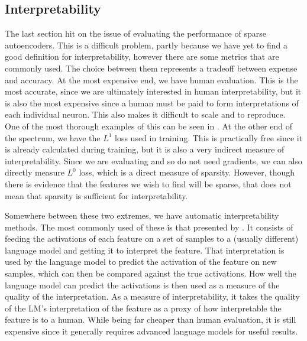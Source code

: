 \documentclass[../../main.tex]{subfiles}
\begin{document}

\subsection{Interpretability}
The last section hit on the issue of evaluating the performance of sparse autoencoders.
This is a difficult problem, partly because we have yet to find a good definition for interpretability, however there are some metrics that are commonly used.
The choice between them represents a tradeoff between expense and accuracy.
At the most expensive end, we have human evaluation.
This is the most accurate, since we are ultimately interested in human interpretability, but it is also the most expensive since a human must be paid to form interpretations of each individual neuron.
This also makes it difficult to scale and to reproduce.
One of the most thorough examples of this can be seen in \citet{bricken_towards_2023}.
At the other end of the spectrum, we have the $L^1$ loss used in training.
This is practically free since it is already calculated during training, but it is also a very indirect measure of interpretability.
Since we are evaluating and so do not need gradients, we can also directly measure $L^0$ loss, which is a direct measure of sparsity.
However, though there is evidence that the features we wish to find will be sparse, that does not mean that sparsity is sufficient for interpretability.

Somewhere between these two extremes, we have automatic interpretability methods.
The most commonly used of these is that presented by \citet{bills_language_2023}.
It consists of feeding the activations of each feature on a set of samples to a (usually different) language model and getting it to interpret the feature.
That interpretation is used by the language model to predict the activation of the feature on new samples, which can then be compared against the true activations.
How well the language model can predict the activations is then used as a measure of the quality of the interpretation.
As a measure of interpretability, it takes the quality of the LM's interpretation of the feature as a proxy of how interpretable the feature is to a human.
While being far cheaper than human evaluation, it is still expensive since it generally requires advanced language models for useful results.
\end{document}
